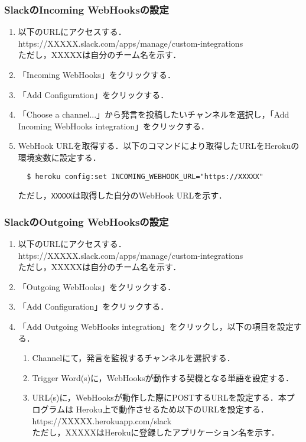 \documentclass[12pt]{jsarticle}
\begin{document}
\subsubsection{SlackのIncoming WebHooksの設定}
\begin{enumerate}
\item 以下のURLにアクセスする．\\
  https://XXXXX.slack.com/apps/manage/custom-integrations\\
  ただし，XXXXXは自分のチーム名を示す．
\item 「Incoming WebHooks」をクリックする．
\item 「Add Configuration」をクリックする．
\item 「Choose a channel...」から発言を投稿したいチャンネルを選択し，「Add Incoming WebHooks integration」をクリックする．
\item WebHook URLを取得する．以下のコマンドにより取得したURLをHerokuの環境変数に設定する．
\begin{verbatim}
  $ heroku config:set INCOMING_WEBHOOK_URL="https://XXXXX"
\end{verbatim}
ただし，\verb|XXXXX|は取得した自分のWebHook URLを示す．
\end{enumerate}

\subsubsection{SlackのOutgoing WebHooksの設定}
\begin{enumerate}
\item 以下のURLにアクセスする．\\
 https://XXXXX.slack.com/apps/manage/custom-integrations\\
  ただし，XXXXXは自分のチーム名を示す．
\item 「Outgoing WebHooks」をクリックする．
\item 「Add Configuration」をクリックする．
\item 「Add Outgoing WebHooks integration」をクリックし，以下の項目を設定する．
\newpage
\begin{enumerate}
  \item Channelにて，発言を監視するチャンネルを選択する．
  \item Trigger Word(s)に，WebHooksが動作する契機となる単語を設定する．
  \item URL(s)に，WebHooksが動作した際にPOSTするURLを設定する．本プログラムは
  Heroku上で動作させるため以下のURLを設定する．\\
  https://XXXXX.herokuapp.com/slack \\
  ただし，XXXXXはHerokuに登録したアプリケーション名を示す．
\end{enumerate}
\end{enumerate}
\end{document}
